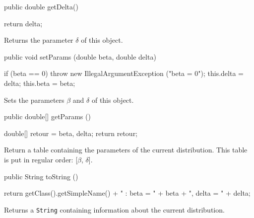 \begin{code}

   public double getDelta()\begin{hide} {
      return delta;
   }
\end{hide}
\end{code}
 \begin{tabb}
   Returns the parameter $\delta$ of this object.
 \end{tabb}
\begin{code}

   public void setParams (double beta, double delta)\begin{hide} {
     if (beta == 0)
         throw new IllegalArgumentException ("beta = 0");
      this.delta  = delta;
      this.beta = beta;
   }\end{hide}
\end{code}
 \begin{tabb}
   Sets the parameters  $\beta$  and $\delta$ of this object.
 \end{tabb}
\begin{code}

   public double[] getParams ()\begin{hide} {
      double[] retour = {beta, delta};
      return retour;
   }\end{hide}
\end{code}
\begin{tabb}
   Return a table containing the parameters of the current distribution.
   This table is put in regular order: [$\beta$, $\delta$].
\end{tabb}
\begin{hide}\begin{code}

   public String toString ()\begin{hide} {
      return getClass().getSimpleName() + " : beta = " + beta + ", delta = " + delta;
   }\end{hide}
\end{code}
\begin{tabb}
   Returns a \texttt{String} containing information about the current distribution.
\end{tabb}\end{hide}
\begin{code}\begin{hide}
}\end{hide}
\end{code}
